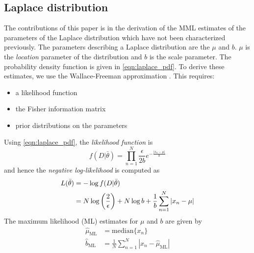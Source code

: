 \documentclass[wcp]{jmlr}
\begin{document}
\subsection{Laplace distribution}
The contributions of this paper is in the derivation of the MML estimates of 
the parameters of the Laplace distribution which have not been characterized previously.
The parameters describing a Laplace distribution are the $\mu$ and $b$. $\mu$ 
is the \emph{location} parameter of the distribution and $b$ is the {scale} parameter. The probability
density function is given in \eqref{eqn:laplace_pdf}. To derive these estimates,
we use the Wallace-Freeman approximation \citep{wallace-87}. This requires:
\begin{itemize}
  \item a likelihood function
  \item the Fisher information matrix
  \item prior distributions on the parameters
\end{itemize}
Using \eqref{eqn:laplace_pdf}, the \emph{likelihood function} is
\[ f(D|\bar{\theta}) = \prod_{n=1}^N \frac{\epsilon}{2b} e^{-\frac{|x_n-\mu|}{b}} \]
and hence the \emph{negative log-likelihood} is computed as
\begin{align}
 L(\bar{\theta}) &= -\log f(D|\bar{\theta}) \notag\\
		 &= N\log\left(\frac{2}{\epsilon}\right) + N\log b + \frac{1}{b}\sum_{n=1}^N |x_n-\mu| \label{eqn:laplace_l}
\end{align}
The maximum likelihood (ML) estimates for $\mu$ and $b$ are given by
\begin{align*}
\hat{\mu}_{\mathrm{ML}} &= \mathrm{median}\{x_n\} \\ 
\hat{b}_{\mathrm{ML}} &= \frac{1}{N} \sum_{n=1}^N |x_n-\hat{\mu}_{\mathrm{ML}}|
\end{align*}
\end{document}

